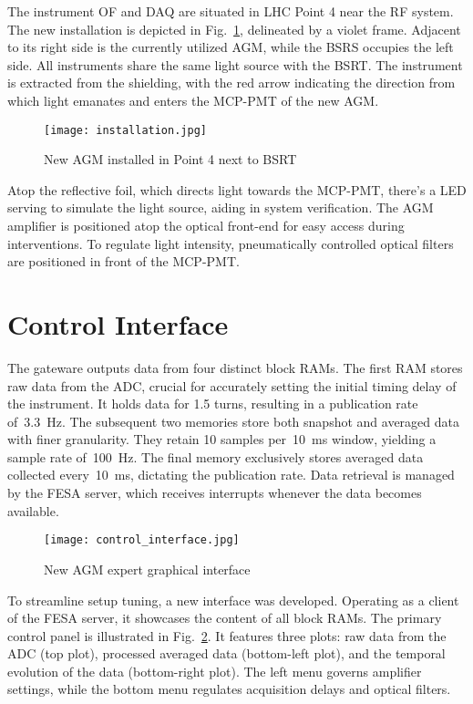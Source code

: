 The instrument OF and DAQ are situated in LHC Point 4 near the RF system. The
new installation is depicted in Fig.~\ref{fig:installation}, delineated by a
violet frame. Adjacent to its right side is the currently utilized AGM, while
the BSRS occupies the left side. All instruments share the same light source
with the BSRT. The instrument is extracted from the shielding, with the red
arrow indicating the direction from which light emanates and enters the MCP-PMT
of the new AGM.
\begin{figure}[!tbh]
    \centering
    \texttt{[image: installation.jpg]}
    \caption{New AGM installed in Point 4 next to BSRT}
    \label{fig:installation}
\end{figure}
Atop the reflective foil, which directs light towards the MCP-PMT, there's a
LED serving to simulate the light source, aiding in system verification. The
AGM amplifier is positioned atop the optical front-end for easy access during
interventions. To regulate light intensity, pneumatically controlled optical
filters are positioned in front of the MCP-PMT.

\section{Control Interface}
The gateware outputs data from four distinct block RAMs. The first RAM stores
raw data from the ADC, crucial for accurately setting the initial timing delay
of the instrument. It holds data for 1.5 turns, resulting in a publication rate
of~\SI{3.3}{Hz}. The subsequent two memories store both snapshot and averaged
data with finer granularity. They retain 10 samples per~\SI{10}{ms} window,
yielding a sample rate of~\SI{100}{Hz}. The final memory exclusively stores
averaged data collected every~\SI{10}{ms}, dictating the publication rate. Data
retrieval is managed by the FESA server, which receives interrupts whenever the
data becomes available.
\begin{figure}[!tbh]
    \centering
    \texttt{[image: control\_interface.jpg]}
    \caption{New AGM expert graphical interface}
    \label{fig:control_interface}
\end{figure}
To streamline setup tuning, a new interface was developed. Operating as a
client of the FESA server, it showcases the content of all block RAMs. The
primary control panel is illustrated in Fig.~\ref{fig:control_interface}. It
features three plots: raw data from the ADC (top plot), processed averaged data
(bottom-left plot), and the temporal evolution of the data (bottom-right plot).
The left menu governs amplifier settings, while the bottom menu regulates
acquisition delays and optical filters.


